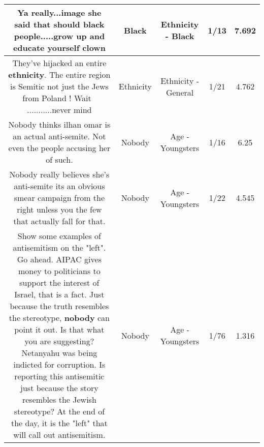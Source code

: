 \documentclass[11pt]{article}
\newlength\mylength
\begin{document}
\begin{center}
\begin{longtable}{|C{.65\mylength}|C{.30\mylength}|C{.12\mylength}|C{.12\mylength}|C{.12\mylength}|}
  \small Ya really...image she said that should \textbf{black} people.....grow up and educate yourself clown\normalsize   & Black & Ethnicity - Black & 1/13 & 7.692 \\  \hline
  \small They've hijacked an entire \textbf{ethnicity}. The entire region is Semitic not just the Jews from Poland ! Wait 🤔 ...........never mind\normalsize   & Ethnicity & Ethnicity - General & 1/21 & 4.762 \\  \hline
  \small Nobody thinks ilhan omar is an actual anti-semite. Not even the people accusing her of such.\normalsize   & Nobody & Age - Youngsters & 1/16 & 6.25 \\  \hline
  \small Nobody really believes she's anti-semite its an obvious smear campaign from the right unless you the few that actually fall for that.\normalsize   & Nobody & Age - Youngsters & 1/22 & 4.545 \\  \hline
  \small Show some examples of antisemitism on the "left". Go ahead. AIPAC gives money to politicians to support the interest of Israel, that is a fact. Just because the truth resembles the stereotype, \textbf{nobody} can point it out. Is that what you are suggesting? Netanyahu was being indicted for corruption. Is reporting this antisemitic just because the story resembles the Jewish stereotype? At the end of the day, it is the "left" that will call out antisemitism.\normalsize   & Nobody & Age - Youngsters & 1/76 & 1.316 \\  \hline

\end{longtable}
\end{center}
\end{document}
